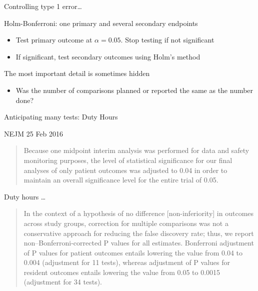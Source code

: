 \documentclass[ignorenonframetext,]{beamer}
\begin{document}
\begin{frame}{Controlling type 1 error\ldots{}}

Holm-Bonferroni: one primary and several secondary endpoints

\begin{itemize}
\item
  Test primary outcome at \(\alpha = 0.05\). Stop testing if not
  significant
\item
  If significant, test secondary outcomes using Holm's method
\end{itemize}

The most important detail is sometimes hidden

\begin{itemize}
\itemsep1pt\parskip0pt
\item
  Was the number of comparisons planned or reported the same as the
  number done?
\end{itemize}

\end{frame}

\begin{frame}{Anticipating many tests: Duty Hours}

NEJM 25 Feb 2016

\begin{quote}
Because one midpoint interim analysis was performed for data and safety monitoring purposes, the level of statistical significance for our final analyses of only patient outcomes was adjusted to 0.04 in order to maintain an overall significance level for the entire trial of 0.05. 
\end{quote}

\end{frame}

\begin{frame}{Duty hours \ldots}

\begin{quote}
In the context of a hypothesis of no difference [non-inferiority] in outcomes across study groups, correction for multiple comparisons was not a conservative approach for reducing the false discovery rate; thus, we report non–Bonferroni-corrected P values for all estimates. Bonferroni adjustment of P values for patient outcomes entails lowering the value from 0.04 to 0.004 (adjustment for 11 tests), whereas adjustment of P values for resident outcomes entails lowering the value from 0.05 to 0.0015 (adjustment for 34 tests).
\end{quote}

\end{frame}
\end{document}
